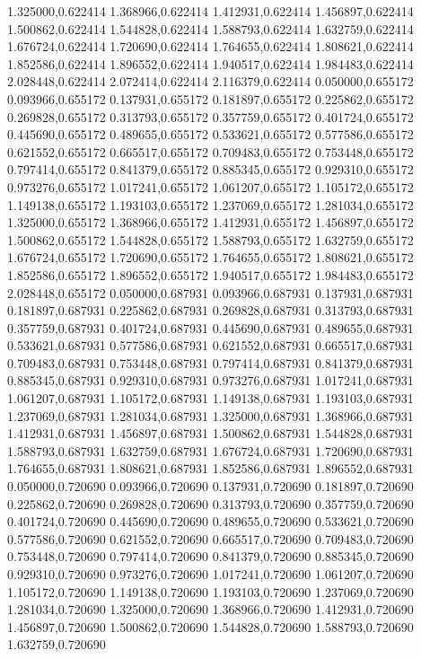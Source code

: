 1.325000,0.622414
1.368966,0.622414
1.412931,0.622414
1.456897,0.622414
1.500862,0.622414
1.544828,0.622414
1.588793,0.622414
1.632759,0.622414
1.676724,0.622414
1.720690,0.622414
1.764655,0.622414
1.808621,0.622414
1.852586,0.622414
1.896552,0.622414
1.940517,0.622414
1.984483,0.622414
2.028448,0.622414
2.072414,0.622414
2.116379,0.622414
0.050000,0.655172
0.093966,0.655172
0.137931,0.655172
0.181897,0.655172
0.225862,0.655172
0.269828,0.655172
0.313793,0.655172
0.357759,0.655172
0.401724,0.655172
0.445690,0.655172
0.489655,0.655172
0.533621,0.655172
0.577586,0.655172
0.621552,0.655172
0.665517,0.655172
0.709483,0.655172
0.753448,0.655172
0.797414,0.655172
0.841379,0.655172
0.885345,0.655172
0.929310,0.655172
0.973276,0.655172
1.017241,0.655172
1.061207,0.655172
1.105172,0.655172
1.149138,0.655172
1.193103,0.655172
1.237069,0.655172
1.281034,0.655172
1.325000,0.655172
1.368966,0.655172
1.412931,0.655172
1.456897,0.655172
1.500862,0.655172
1.544828,0.655172
1.588793,0.655172
1.632759,0.655172
1.676724,0.655172
1.720690,0.655172
1.764655,0.655172
1.808621,0.655172
1.852586,0.655172
1.896552,0.655172
1.940517,0.655172
1.984483,0.655172
2.028448,0.655172
0.050000,0.687931
0.093966,0.687931
0.137931,0.687931
0.181897,0.687931
0.225862,0.687931
0.269828,0.687931
0.313793,0.687931
0.357759,0.687931
0.401724,0.687931
0.445690,0.687931
0.489655,0.687931
0.533621,0.687931
0.577586,0.687931
0.621552,0.687931
0.665517,0.687931
0.709483,0.687931
0.753448,0.687931
0.797414,0.687931
0.841379,0.687931
0.885345,0.687931
0.929310,0.687931
0.973276,0.687931
1.017241,0.687931
1.061207,0.687931
1.105172,0.687931
1.149138,0.687931
1.193103,0.687931
1.237069,0.687931
1.281034,0.687931
1.325000,0.687931
1.368966,0.687931
1.412931,0.687931
1.456897,0.687931
1.500862,0.687931
1.544828,0.687931
1.588793,0.687931
1.632759,0.687931
1.676724,0.687931
1.720690,0.687931
1.764655,0.687931
1.808621,0.687931
1.852586,0.687931
1.896552,0.687931
0.050000,0.720690
0.093966,0.720690
0.137931,0.720690
0.181897,0.720690
0.225862,0.720690
0.269828,0.720690
0.313793,0.720690
0.357759,0.720690
0.401724,0.720690
0.445690,0.720690
0.489655,0.720690
0.533621,0.720690
0.577586,0.720690
0.621552,0.720690
0.665517,0.720690
0.709483,0.720690
0.753448,0.720690
0.797414,0.720690
0.841379,0.720690
0.885345,0.720690
0.929310,0.720690
0.973276,0.720690
1.017241,0.720690
1.061207,0.720690
1.105172,0.720690
1.149138,0.720690
1.193103,0.720690
1.237069,0.720690
1.281034,0.720690
1.325000,0.720690
1.368966,0.720690
1.412931,0.720690
1.456897,0.720690
1.500862,0.720690
1.544828,0.720690
1.588793,0.720690
1.632759,0.720690
